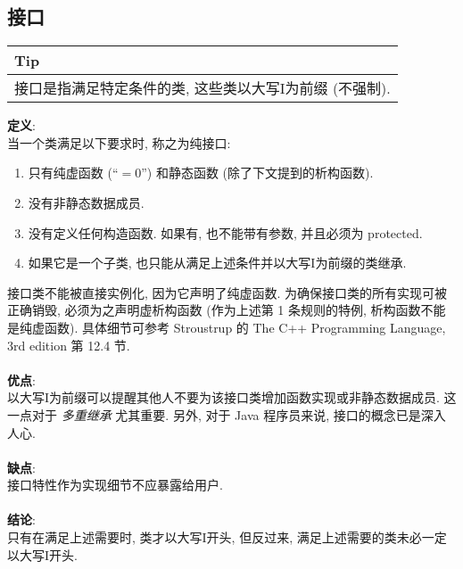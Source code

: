 \documentclass[a4paper,11pt,CJK]{article}
\begin{document}
\begin{CJK}{UTF8}{gbsn}
\subsection{接口}
\begin{table}[htbp]
\flushleft
\begin{tabular}{p{400pt}}
\toprule
\rowcolor[gray]{.8} Tip \\
\midrule
接口是指满足特定条件的类, 这些类以大写I为前缀 (不强制).\\
\bottomrule
\end{tabular}
\end{table}
\noindent
\textbf{定义}:\\
\indent 当一个类满足以下要求时, 称之为纯接口:
\begin{enumerate}
\item
只有纯虚函数 (``$=$0'') 和静态函数 (除了下文提到的析构函数).
\item
没有非静态数据成员.
\item
没有定义任何构造函数. 如果有, 也不能带有参数, 并且必须为 protected.
\item
如果它是一个子类, 也只能从满足上述条件并以大写I为前缀的类继承.
\end{enumerate}
接口类不能被直接实例化, 因为它声明了纯虚函数. 为确保接口类的所有实现可被正确销毁, 必须为之声明虚析构函数 (作为上述第 1 条规则的特例, 析构函数不能是纯虚函数). 具体细节可参考 Stroustrup 的 The C++ Programming Language, 3rd edition 第 12.4 节.\\
\\
\textbf{优点}:\\
\indent 以大写I为前缀可以提醒其他人不要为该接口类增加函数实现或非静态数据成员. 这一点对于 \emph{多重继承} 尤其重要. 另外, 对于 Java 程序员来说, 接口的概念已是深入人心.\\
\\
\textbf{缺点}:\\
\indent 接口特性作为实现细节不应暴露给用户.\\
\\
\textbf{结论}:\\
\indent 只有在满足上述需要时, 类才以大写I开头, 但反过来, 满足上述需要的类未必一定以大写I开头.


\end{CJK}
\end{document}
